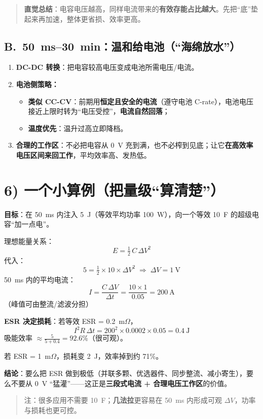 \documentclass[11pt]{ctexart}
\begin{document}
\begin{quote}
\textbf{直觉总结}：电容电压越高，同样电流带来的\textbf{有效存能占比越大}。先把“底”垫起来再加速，整体更省损、效率更高。
\end{quote}

\subsection*{B.~50~ms--30~min：温和给电池（“海绵放水”）}
\begin{enumerate}
  \item \textbf{DC-DC 转换}：把电容较高电压变成电池所需电压/电流。
  \item \textbf{电池侧策略：}
  \begin{itemize}
    \item \textbf{类似 CC-CV}：前期用\textbf{恒定且安全的电流}（遵守电池 C-rate），电池电压接近上限时转为“电压受控”，\textbf{电流自然回落}；
    \item \textbf{温度优先}：温升过高立即降档。
  \end{itemize}
  \item \textbf{合理的工作区}：不必把电容从 0~V 充到满，也不必榨到见底；让它\textbf{在高效率电压区间来回工作}，平均效率高、发热低。
\end{enumerate}

\section{6) 一个小算例（把量级“算清楚”）}
\textbf{目标}：在 50~ms 内注入 5~J（等效平均功率 100~W），向一个等效 10~F 的超级电容“加一点电”。

\noindent 理想能量关系：
\[
  E=\tfrac{1}{2}\, C\, \Delta V^2
\]
代入：
\[
  5=\tfrac{1}{2}\times 10 \times \Delta V^2 \;\Rightarrow\; \Delta V=1\ \text{V}
\]
50~ms 内的平均电流：
\[
  I=\frac{C\,\Delta V}{\Delta t}= \frac{10\times 1}{0.05}=200\ \text{A}
\]
（峰值可由整流/滤波分担）

\noindent \textbf{ESR 决定损耗}：若等效 ESR = 0.2~m$\Omega$，
\[
  I^2R \,\Delta t = 200^2\times 0.0002\times 0.05 = 0.4\ \text{J}
\]
吸能效率 $\approx \tfrac{5}{5+0.4}=92.6\%$（很可观）。

若 ESR = 1~m$\Omega$，损耗变 2~J，效率掉到约 71\%。

\noindent \textbf{结论}：要么把 ESR 做到极低（并联多颗、优选器件、同步整流、减小寄生），要么不要从 0~V “猛灌”——这正是\textbf{三段式电流 + 合理电压工作区}的价值。

\begin{quote}
注：很多应用不需要 10~F；\textbf{几法拉}更容易在 50~ms 内形成可观 $\Delta V$，功率与损耗也更可控。
\end{quote}
\end{document}
